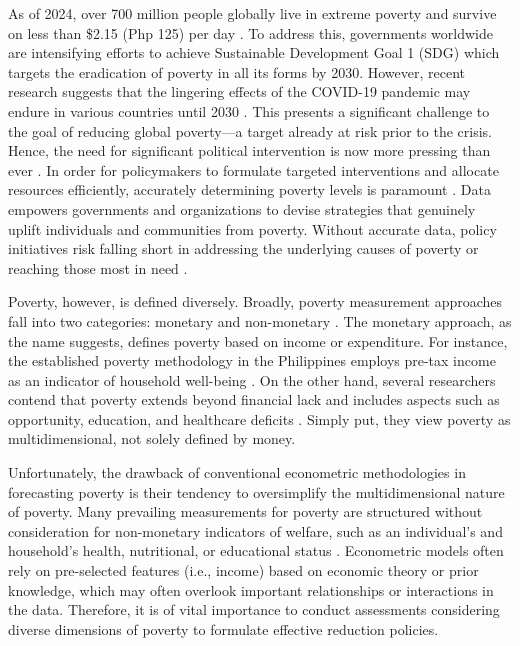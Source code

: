 \documentclass[a4paper,fleqn]{cas-sc}
\begin{document}
As of 2024, over 700 million people globally live in extreme poverty and survive on less than \$2.15 (Php 125) per day \citep{worldbank2024poverty}. To address this, governments worldwide are intensifying efforts to achieve Sustainable Development Goal 1 (SDG) which targets the eradication of poverty in all its forms by 2030. However, recent research suggests that the lingering effects of the COVID-19 pandemic may endure in various countries until 2030 \citep{shulla2021effects}. This presents a significant challenge to the goal of reducing global poverty—a target already at risk prior to the crisis. Hence, the need for significant political intervention is now more pressing than ever \citep{worldbank2024poverty}. In order for policymakers to formulate targeted interventions and allocate resources efficiently, accurately determining poverty levels is paramount \citep{riegner2016implementing}. Data empowers governments and organizations to devise strategies that genuinely uplift individuals and communities from poverty. Without accurate data, policy initiatives risk falling short in addressing the underlying causes of poverty or reaching those most in need \citep{grindle2004good}.

Poverty, however, is defined diversely. Broadly, poverty measurement approaches fall into two categories: monetary and non-monetary \citep{decerf2023preference}. The monetary approach, as the name suggests, defines poverty based on income or expenditure. For instance, the established poverty methodology in the Philippines employs pre-tax income as an indicator of household well-being \citep{albert2023analysis, briones2021income}. On the other hand, several researchers contend that poverty extends beyond financial lack and includes aspects such as opportunity, education, and healthcare deficits \citep{alkire2015multidimensional}. Simply put, they view poverty as multidimensional, not solely defined by money.

Unfortunately, the drawback of conventional econometric methodologies in forecasting poverty is their tendency to oversimplify the multidimensional nature of poverty. Many prevailing measurements for poverty are structured without consideration for non-monetary indicators of welfare, such as an individual’s and household’s health, nutritional, or educational status \citep{watson2017non}. Econometric models often rely on pre-selected features (i.e., income) based on economic theory or prior knowledge, which may often overlook important relationships or interactions in the data. Therefore, it is of vital importance to conduct assessments considering diverse dimensions of poverty to formulate effective reduction policies.
\end{document}
